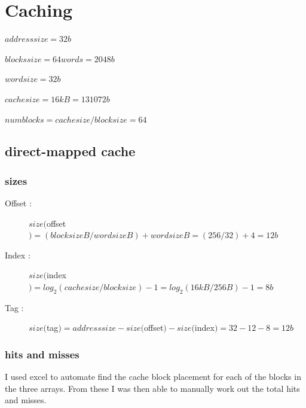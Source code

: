 \documentclass[12pt]{article}
\begin{document}
		\newpage
	
	\section{Caching}

		$addresssize = 32 b$

		$blockssize = 64 words = 2048 b$

		$wordsize = 32b$

		$cachesize =  16kB = 131072 b$

		$numblocks = cachesize/blocksize = 64$


		\subsection{direct-mapped cache}

			\subsubsection{sizes}
				\begin{description}
					\item[Offset : ] $size($offset$) = (blocksize B/wordsize B) + wordsize B = (256/32) + 4 = 12b$
					\item[Index : ] $size($index$) = log_2(cachesize/blocksize) - 1 = log_2(16kB/256B) - 1 = 8b$
					\item[Tag : ] $size($tag$) = addresssize- size($offset$) - size($index$) = 32 - 12 - 8 = 12b$
				\end{description}

			\subsubsection{hits and misses}

I used excel to automate find the cache block placement for each of the blocks in the three arrays. From these I was then able to manually work out the total hits and misses.
\end{document}
